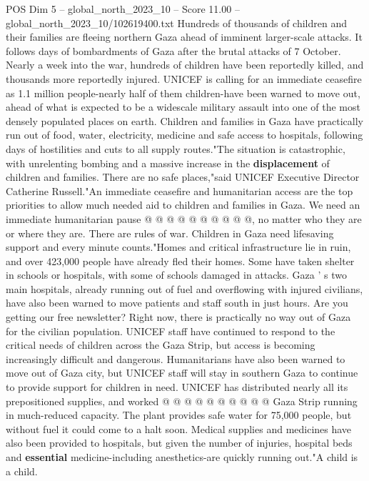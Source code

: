 \begin{textsample}{POS Dim 5 – global\_north\_2023\_10 – Score 11.00 – global\_north\_2023\_10/102619400.txt}  \label{ex:f5_pos_428}
Hundreds of thousands of children and their families are fleeing northern Gaza ahead of imminent larger-scale attacks.
It follows days of bombardments of Gaza after the brutal attacks of 7 October.
Nearly a week into the war, hundreds of children have been reportedly killed, and thousands more reportedly injured.
UNICEF is calling for an immediate ceasefire as 1.1 million people-nearly half of them children-have been warned to move out, ahead of what is expected to be a widescale military assault into one of the most densely populated places on earth.
Children and families in Gaza have practically run out of food, water, electricity, medicine and safe access to hospitals, following days of hostilities and cuts to all supply routes."The situation is catastrophic, with unrelenting bombing and a massive increase in the \textbf{displacement} of children and families.
There are no safe places,"said UNICEF Executive Director Catherine Russell."An immediate ceasefire and humanitarian access are the top priorities to allow much needed aid to children and families in Gaza.
We need an immediate humanitarian pause @ @ @ @ @ @ @ @ @ @, no matter who they are or where they are.
There are rules of war.
Children in Gaza need lifesaving support and every minute counts."Homes and critical infrastructure lie in ruin, and over 423,000 people have already fled their homes.
Some have taken shelter in schools or hospitals, with some of schools damaged in attacks.
Gaza ' s two main hospitals, already running out of fuel and overflowing with injured civilians, have also been warned to move patients and staff south in just hours.
Are you getting our free newsletter?
Right now, there is practically no way out of Gaza for the civilian population.
UNICEF staff have continued to respond to the critical needs of children across the Gaza Strip, but access is becoming increasingly difficult and dangerous.
Humanitarians have also been warned to move out of Gaza city, but UNICEF staff will stay in southern Gaza to continue to provide support for children in need.
UNICEF has distributed nearly all its prepositioned supplies, and worked @ @ @ @ @ @ @ @ @ @ Gaza Strip running in much-reduced capacity.
The plant provides safe water for 75,000 people, but without fuel it could come to a halt soon.
Medical supplies and medicines have also been provided to hospitals, but given the number of injuries, hospital beds and \textbf{essential} medicine-including anesthetics-are quickly running out."A child is a child.

\end{textsample}
